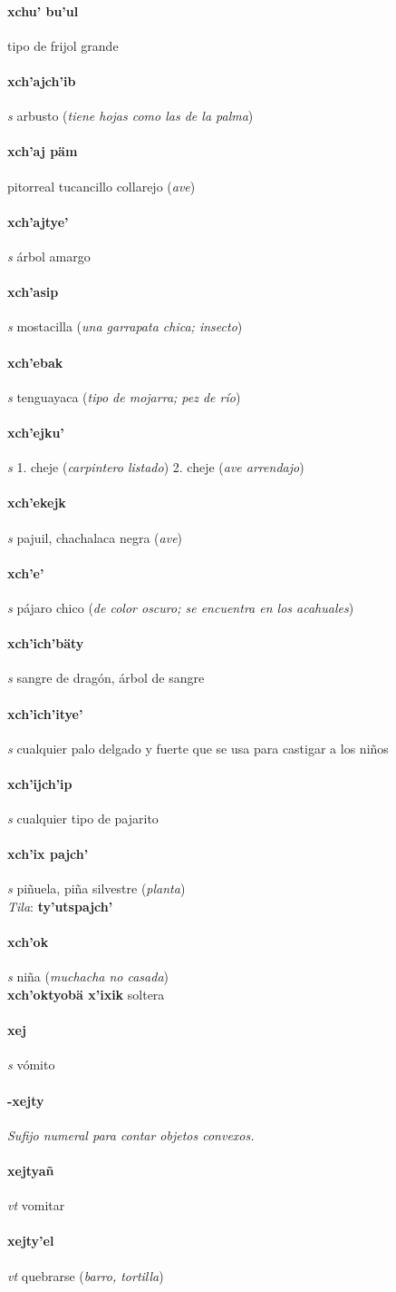 \documentclass{scrbook}
\newcommand{\entry}[1]{\paragraph{#1}}
\newcommand{\onedefinition}[1]{#1.}
\newcommand{\nontranslationdef}[1]{\textit{#1}}
\newcommand{\partofspeech}[1]{\textit{#1}}
\newcommand{\spanishtranslation}[1]{#1}
\newcommand{\clarification}[1]{(\textit{#1})}
\newcommand{\dialectvariant}[1]{\\\textit{#1}:}
\newcommand{\dialectword}[1]{\textbf{#1}}
\newcommand{\secondaryentry}[1]{\\\textbf{#1}}
\newcommand{\secondtranslation}[1]{#1}
\begin{document}
\begin{multicols}{2}
\entry{xchu' bu'ul}
\spanishtranslation{tipo de frijol grande}

\entry{xch'ajch'ib}
\partofspeech{s}
\spanishtranslation{arbusto}
\clarification{tiene hojas como las de la palma}

\entry{xch'aj päm}
\spanishtranslation{pitorreal}
\spanishtranslation{tucancillo collarejo}
\clarification{ave}

\entry{xch'ajtye'}
\partofspeech{s}
\spanishtranslation{árbol amargo}

\entry{xch'asip}
\partofspeech{s}
\spanishtranslation{mostacilla}
\clarification{una garrapata chica; insecto}

\entry{xch'ebak}
\partofspeech{s}
\spanishtranslation{tenguayaca}
\clarification{tipo de mojarra; pez de río}

\entry{xch'ejku'}
\partofspeech{s}
\onedefinition{1}
\spanishtranslation{cheje}
\clarification{carpintero listado}
\onedefinition{2}
\spanishtranslation{cheje}
\clarification{ave arrendajo}

\entry{xch'ekejk}
\partofspeech{s}
\spanishtranslation{pajuil, chachalaca negra}
\clarification{ave}

\entry{xch'e'}
\partofspeech{s}
\spanishtranslation{pájaro chico}
\clarification{de color oscuro; se encuentra en los acahuales}

\entry{xch'ich'bäty}
\partofspeech{s}
\spanishtranslation{sangre de dragón, árbol de sangre}

\entry{xch'ich'itye'}
\partofspeech{s}
\spanishtranslation{cualquier palo delgado y fuerte que se usa para castigar a los niños}

\entry{xch'ijch'ip}
\partofspeech{s}
\spanishtranslation{cualquier tipo de pajarito}

\entry{xch'ix pajch'}
\partofspeech{s}
\spanishtranslation{piñuela, piña silvestre}
\clarification{planta}
\dialectvariant{Tila}
\dialectword{ty'utspajch'}

\entry{xch'ok}
\partofspeech{s}
\spanishtranslation{niña}
\clarification{muchacha no casada}
\secondaryentry{xch'oktyobä x'ixik}
\secondtranslation{soltera}

\entry{xej}
\partofspeech{s}
\spanishtranslation{vómito}

\entry{-xejty}
\nontranslationdef{Sufijo numeral para contar objetos convexos.}

\entry{xejtyañ}
\partofspeech{vt}
\spanishtranslation{vomitar}

\entry{xejty'el}
\partofspeech{vt}
\spanishtranslation{quebrarse}
\clarification{barro, tortilla}


\end{multicols}
\end{document}
